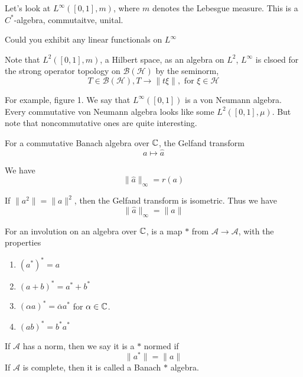Let's look at $L^\infty([0,1], m)$, where $m$ denotes the Lebesgue measure. This is a $C^*$-algebra, commutaitve, unital.

Could you exhibit any linear functionals on $L^\infty$

Note that $L^2([0,1],m)$, a Hilbert space, as an algebra on $L^2$, $L^\infty$ is clsoed for the strong operator topology on $\mathcal{B}(\mathcal{H})$ by the seminorm,
\begin{equation*}
    T\in\mathcal{B}(\mathcal{H}), T\to\|t\xi\|, \text{ for } \xi\in\mathcal{H}
\end{equation*}

For example, figure 1. We say that $L^\infty([0,1])$ is a von Neumann algebra. Every commutative von Neumann algebra looks like some $L^2([0,1], \mu)$. But note that noncommutative ones are quite interesting.

For a commutative Banach algebra over $\mathbb{C}$, the Gelfand transform
\begin{equation*}
    a\mapsto\widehat{a}
\end{equation*}

We have
\begin{equation*}
    \|\widehat{a}\|_\infty=r(a)
\end{equation*}
\begin{proposition}
    If $\|a^2\|=\|a\|^2$, then the Gelfand transform is isometric. Thus we have
\begin{equation*}
    \|\widehat{a}\|_\infty=\|a\|
\end{equation*}
\end{proposition}

\begin{definition}[Involution $*$]
    For an involution on an algebra over $\mathbb{C}$, is a map $*$ from $\mathcal{A}\to\mathcal{A}$, with the properties
\begin{enumerate}
    \item $(a^*)^*=a$
    \item $(a+b)^*=a^*+b^*$
    \item $(\alpha a)^*=\overline{\alpha}a^*$ for $\alpha\in\mathbb{C}$.
    \item $(ab)^*=b^*a^*$
\end{enumerate}
\end{definition}

\begin{definition}
    If $\mathcal{A}$ has a norm, then we say it is a $*$ normed if
\begin{equation*}
    \|a^*\|=\|a\|
\end{equation*}
If $\mathcal{A}$ is complete, then it is called a Banach $*$ algebra.
\end{definition}

